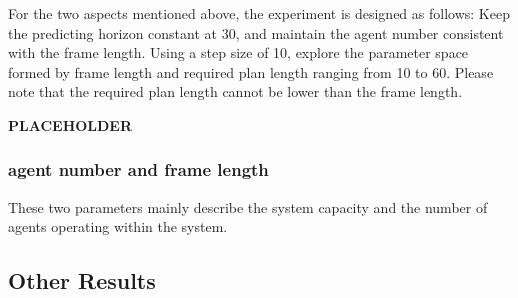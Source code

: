 For the two aspects mentioned above, the experiment is designed as follows: Keep the predicting horizon constant at 30, and maintain the agent number consistent with the frame length. Using a step size of 10, explore the parameter space formed by frame length and required plan length ranging from 10 to 60. Please note that the required plan length cannot be lower than the frame length.
    
\textbf{PLACEHOLDER} %

\subsubsection{agent number and frame length}

These two parameters mainly describe the system capacity and the number of agents operating within the system.



\subsection{Other Results}
